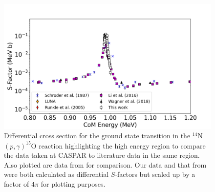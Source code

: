 \begin{figure}
		\includegraphics[width=1.0\linewidth]{figures/high_gs.png}
	\caption{Differential cross section for the ground state transition in the $^{14}$N$\left( p,\gamma \right) ^{15}$O reaction highlighting the high energy region to compare the data taken at CASPAR to literature data in the same region. Also plotted are data from \cite{Schroder1987, Li2016, Wagner2018} for comparison. Our data and that from \citet{Li2016} were both calculated as differential $S$-factors but scaled up by a factor of $4\pi$ for plotting purposes.  }
	\label{fig: highCompareGS}
\end{figure}



